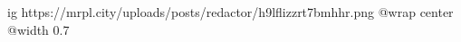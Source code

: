  
 
 
 
 

\ifcmt
  ig https://mrpl.city/uploads/posts/redactor/h9lflizzrt7bmhhr.png
  @wrap center
  @width 0.7
\fi
